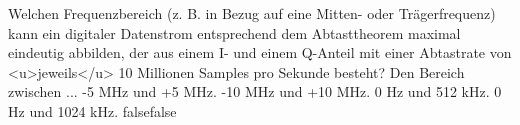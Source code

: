     {Welchen Frequenzbereich (z. B. in Bezug auf eine Mitten- oder Trägerfrequenz) kann ein digitaler Datenstrom entsprechend dem Abtasttheorem maximal eindeutig abbilden, der aus einem I- und einem Q-Anteil mit einer Abtastrate von <u>jeweils</u> 10 Millionen Samples pro Sekunde besteht? Den Bereich zwischen ...}
    {-5 MHz und +5 MHz.}
    {-10 MHz und +10 MHz.}
    {0 Hz und 512 kHz.}
    {0 Hz und 1024 kHz.}
    {false}{false}